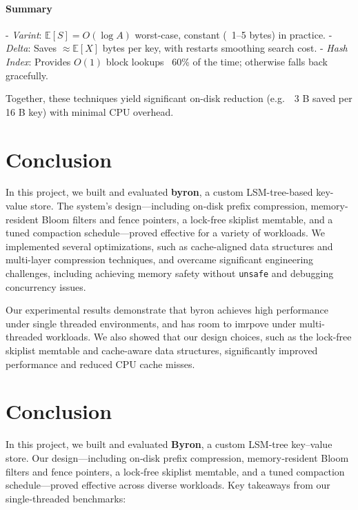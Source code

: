 \documentclass[10pt]{article}
\begin{document}
\paragraph{Summary}
- \emph{Varint}: \(\mathbb{E}[S]=O(\log A)\) worst-case, constant (~1–5 bytes) in practice.
- \emph{Delta}: Saves \(\approx\mathbb{E}[X]\) bytes per key, with restarts smoothing search cost.
- \emph{Hash Index}: Provides \(O(1)\) block lookups ~60\% of the time; otherwise falls back gracefully.

Together, these techniques yield significant on-disk reduction (e.g.\ ~3 B saved per 16 B key) with minimal CPU overhead.

\section*{Conclusion}
In this project, we built and evaluated \textbf{byron}, a custom LSM-tree-based key-value store. The system’s design—including on-disk prefix compression, memory-resident Bloom filters and fence pointers, a lock-free skiplist memtable, and a tuned compaction schedule—proved effective for a variety of workloads. We implemented several optimizations, such as cache-aligned data structures and multi-layer compression techniques, and overcame significant engineering challenges, including achieving memory safety without \texttt{unsafe} and debugging concurrency issues.

Our experimental results demonstrate that byron achieves high performance under single threaded environments, and has room to imrpove under multi-threaded workloads. We also showed that our design choices, such as the lock-free skiplist memtable and cache-aware data structures, significantly improved performance and reduced CPU cache misses.
\section*{Conclusion}
In this project, we built and evaluated \textbf{Byron}, a custom LSM‐tree key–value store. Our design—including on‐disk prefix compression, memory‐resident Bloom filters and fence pointers, a lock‐free skiplist memtable, and a tuned compaction schedule—proved effective across diverse workloads. Key takeaways from our single‐threaded benchmarks:
\end{document}
